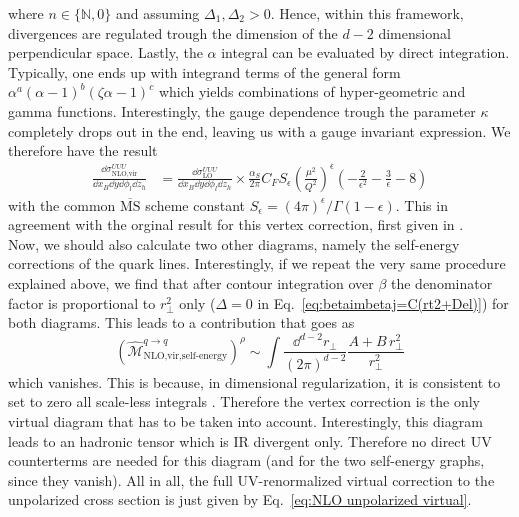 where $n\in \{\mathbb{N},0\}$ and assuming $\Delta_1,\Delta_2>0$. Hence, within this framework, divergences are regulated trough the dimension of the $d-2$ dimensional perpendicular space. Lastly, the $\alpha$ integral can be evaluated by direct integration. Typically, one ends up with integrand terms of the general form $\alpha^a (\alpha-1)^b (\zeta \alpha-1)^c$ which yields combinations of hyper-geometric and gamma functions. Interestingly, the gauge dependence trough the parameter $\kappa$ completely drops out in the end, leaving us with a gauge invariant expression. We therefore have the result
\begin{equation}\label{eq:NLO unpolarized virtual}
\begin{aligned}
      \frac{\dd \sigma^{UUU}_{\text{NLO,vir}}}{\dd x_B \dd y \dd \phi_l \dd z_h}&= \frac{\dd \sigma^{UUU}_{\text{LO}}}{\dd x_B \dd y \dd \phi_l \dd z_h}\times\frac{\alpha_S}{2\pi}  C_F S_\epsilon \left(\frac{\mu^2}{Q^2}\right)^{\epsilon}\left(-\frac{2}{\epsilon^2}-\frac{3}{\epsilon}-8\right)
\end{aligned}
\end{equation}
with the common $\overline{\text{MS}}$ scheme constant $S_\epsilon=(4\pi)^\epsilon/\Gamma(1-\epsilon)$. This in agreement with the orginal result for this vertex correction, first given in \cite{altarelli_large_1979}. \\
Now, we should also calculate two other diagrams, namely the self-energy corrections of the quark lines. Interestingly, if we repeat the very same procedure explained above, we find that after contour integration over $\beta$ the denominator factor is proportional to $r_\perp^2$ only ($\Delta=0$ in Eq.~\ref{eq:betaimbetaj=C(rt2+Del)}) for both diagrams. This leads to a contribution that goes as
\begin{equation}
     (\hat{\mathcal{M}}^{q \to q}_{\text{NLO,vir,self-energy}})^\rho\sim\int\frac{\dd^{d-2} r_\perp}{(2\pi)^{d-2}}\frac{A+B\,r_\perp^2}{r_\perp^2}
\end{equation}
which vanishes. This is because, in dimensional regularization, it is consistent to set to zero all scale-less integrals \cite{Schwartz:2014sze}. Therefore the vertex correction is the only virtual diagram that has to be taken into account. Interestingly, this diagram leads to an hadronic tensor which is IR divergent only. Therefore no direct UV counterterms are needed for this diagram (and for the two self-energy graphs, since they vanish). All in all, the full UV-renormalized virtual correction to the unpolarized cross section is just given by Eq.~\ref{eq:NLO unpolarized virtual}.

